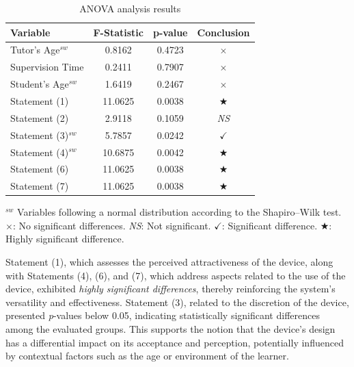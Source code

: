                 \begin{table}[h]
                    \centering
                    \caption{ANOVA analysis results}
                    \begin{tabularx}{0.75\textwidth}{Xccc}
                        \hline
                        \textbf{Variable} & \textbf{F-Statistic} & \textbf{p-value} & \textbf{Conclusion} \\
                        \hline
                        Tutor's Age$^{sw}$ & 0.8162 & 0.4723 & \(\times\) \\ %
                        Supervision Time & 0.2411 & 0.7907 & \(\times\) \\ %
                        Student's Age$^{sw}$ & 1.6419 & 0.2467 & \(\times\) \\ %
                        Statement (1) & 11.0625 & 0.0038 & \(\bigstar\) \\ %
                        Statement (2) & 2.9118 & 0.1059 & \textit{NS} \\ %
                        Statement (3)$^{sw}$ & 5.7857 & 0.0242 & \(\checkmark\) \\ %
                        Statement (4)$^{sw}$ & 10.6875 & 0.0042 & \(\bigstar\) \\ %
                        Statement (6) & 11.0625 & 0.0038 & \(\bigstar\) \\ %
                        Statement (7) & 11.0625 & 0.0038 & \(\bigstar\) \\ %
                        \hline
                    \end{tabularx}
                    \label{table:ANOVA-Results}
                    \vspace{0.3em} %
                    \parbox{0.75\textwidth}{\footnotesize
                        $^{sw}$ Variables following a normal distribution according to the Shapiro–Wilk test.\\
                        \(\times\): No significant differences. \textit{NS}: Not significant. \(\checkmark\): Significant difference. \(\bigstar\): Highly significant difference.
                    }
                \end{table}
                
                Statement (1), which assesses the perceived attractiveness of the device, along with Statements (4), (6), and (7), which address aspects related to the use of the device, exhibited \textit{highly significant differences}, thereby reinforcing the system’s versatility and effectiveness. Statement (3), related to the discretion of the device, presented \textit{p}-values below 0.05, indicating statistically significant differences among the evaluated groups. This supports the notion that the device’s design has a differential impact on its acceptance and perception, potentially influenced by contextual factors such as the age or environment of the learner.
                
